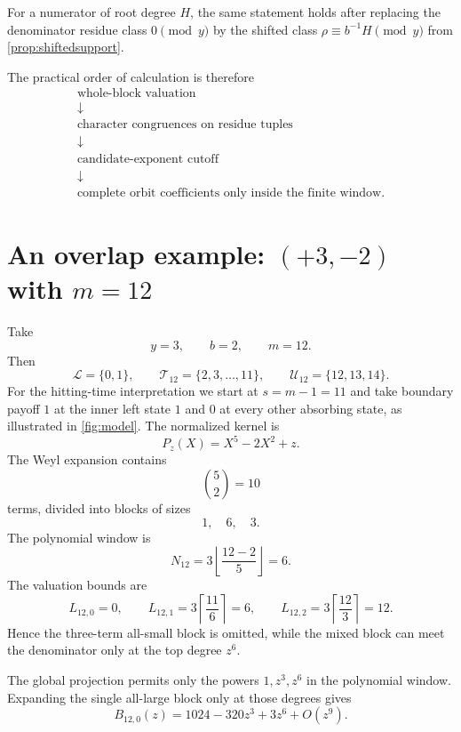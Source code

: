 \documentclass[11pt]{amsart}
\theoremstyle{remark}
\begin{document}
For a numerator of root degree $H$, the same statement holds after replacing the denominator residue class $0\pmod y$ by the shifted class $\rho\equiv b^{-1}H\pmod y$ from \cref{prop:shiftedsupport}.

The practical order of calculation is therefore
\begin{equation}\label{eq:algorithm}
\begin{gathered}
\text{whole-block valuation}\\
\downarrow\\
\text{character congruences on residue tuples}\\
\downarrow\\
\text{candidate-exponent cutoff}\\
\downarrow\\
\text{complete orbit coefficients only inside the finite window}.
\end{gathered}
\end{equation}

\section{An overlap example: \texorpdfstring{$(+3,-2)$}{(+3,-2)} with \texorpdfstring{$m=12$}{m=12}}\label{sec:example12}

Take
\[
    y=3,
    \qquad b=2,
    \qquad m=12.
\]
Then
\[
    \mathcal L=\{0,1\},\qquad
    \mathcal T_{12}=\{2,3,\ldots,11\},\qquad
    \mathcal U_{12}=\{12,13,14\}.
\]
For the hitting-time interpretation we start at $s=m-1=11$ and take boundary payoff $1$ at the inner left state $1$ and $0$ at every other absorbing state, as illustrated in \cref{fig:model}.  The normalized kernel is
\[
    P_z(X)=X^5-2X^2+z.
\]
The Weyl expansion contains
\[
    \binom52=10
\]
terms, divided into blocks of sizes
\[
    1,\quad6,\quad3.
\]
The polynomial window is
\begin{equation}\label{eq:N12}
    N_{12}=3\left\lfloor\frac{12-2}{5}\right\rfloor=6.
\end{equation}
The valuation bounds are
\begin{equation}\label{eq:L12}
    L_{12,0}=0,
    \qquad
    L_{12,1}=3\left\lceil\frac{11}{6}\right\rceil=6,
    \qquad
    L_{12,2}=3\left\lceil\frac{12}{3}\right\rceil=12.
\end{equation}
Hence the three-term all-small block is omitted, while the mixed block can meet the denominator only at the top degree $z^6$.

The global projection permits only the powers $1,z^3,z^6$ in the polynomial window.  Expanding the single all-large block only at those degrees gives
\begin{equation}\label{eq:base12}
    B_{12,0}(z)
    =1024-320z^3+3z^6+O(z^9).
\end{equation}
\end{document}
